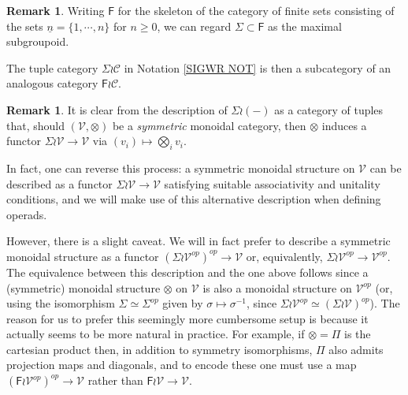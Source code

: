 \documentclass[a4paper,10pt
,draft
]{article}%
\numberwithin{equation}{section}
\numberwithin{figure}{section}
\theoremstyle{definition} %
\newtheorem{remark}[equation]{Remark}%
\newcommand{\V}{\ensuremath{\mathcal V}}
\newcommand{\1}{\ensuremath{\mathbbm 1}}%
\begin{document}
\begin{remark}\label{FWR REM}
Writing $\mathsf{F}$ for the skeleton of 
the category of finite sets consisting of the sets 
$\underline{n} = \{1,\cdots,n\}$ for $n \geq 0$,
we can regard
$\Sigma \subset \mathsf{F}$
as the maximal subgroupoid.

The tuple category $\Sigma \wr \mathcal{C}$
in Notation \ref{SIGWR NOT}
is then a subcategory of an analogous category
$\mathsf{F} \wr \mathcal{C}$.
\end{remark}



\begin{remark}
It is clear from the description
of $\Sigma \wr (-)$
as a category of tuples that, 
should $(\V,\otimes)$ be a \emph{symmetric} monoidal category,
then $\otimes$
induces a functor
$\Sigma \wr \V \to \mathcal{V}$
via $(v_i) \mapsto \bigotimes_i v_i$.

In fact, one can reverse this process: a symmetric monoidal structure on $\V$ can be described as a functor
$\Sigma \wr \V \to \V$
satisfying suitable associativity and unitality conditions, and we will make use of this alternative description when defining operads.

However, there is a slight caveat. 
We will in fact prefer to describe a symmetric monoidal structure
as a functor
$\left(\Sigma \wr \V^{op}\right)^{op} \to \V$
or, equivalently, 
$\Sigma \wr \V^{op} \to \V^{op}$.
The equivalence between this description and the one above
follows since a (symmetric) monoidal structure $\otimes$ on $\V$ is also a monoidal structure on $\V^{op}$
(or, using the isomorphism
$\Sigma \simeq \Sigma^{op}$ given by $\sigma \mapsto \sigma^{-1}$,
since $\Sigma \wr \V^{op} \simeq \left(\Sigma \wr \V \right)^{op}$).
The reason for us to prefer this seemingly more cumbersome setup is because it actually seems to be more natural in practice.
For example, if $\otimes = \Pi$ is the cartesian product then,
in addition to symmetry isomorphisms, 
$\Pi$ also admits projection maps and diagonals,
and to encode these one must use a map
$\left(\mathsf{F} \wr \mathcal{V}^{op}\right)^{op} \to \mathcal{V}$
rather than
$\mathsf{F} \wr \mathcal{V} \to \mathcal{V}$.
\end{remark}
\end{document}
